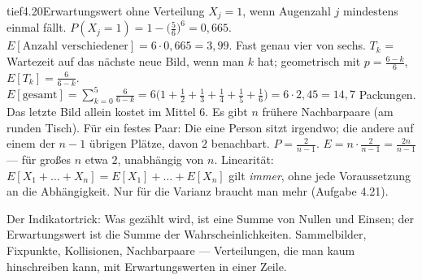 \begin{loesungkarte}{tief}{4.20}{Erwartungswert ohne Verteilung}
$X_j = 1$, wenn Augenzahl $j$ mindestens einmal fällt. $P(X_j = 1) = 1 - \bigl(\frac56\bigr)^{6} = 0{,}665$. $E[\text{Anzahl verschiedener}] = 6\cdot0{,}665 = 3{,}99$. Fast genau vier von sechs.
$T_k$ = Wartezeit auf das nächste neue Bild, wenn man $k$ hat; geometrisch mit $p = \frac{6 - k}6$, $E[T_k] = \frac6{6 - k}$. $E[\text{gesamt}] = \sum_{k=0}^{5}\frac6{6 - k} = 6\bigl(1 + \frac12 + \frac13 + \frac14 + \frac15 + \frac16\bigr) = 6\cdot2{,}45 = 14{,}7$ Packungen. Das letzte Bild allein kostet im Mittel $6$.
Es gibt $n$ frühere Nachbarpaare (am runden Tisch). Für ein festes Paar: Die eine Person sitzt irgendwo; die andere auf einem der $n - 1$ übrigen Plätze, davon $2$ benachbart. $P = \frac2{n - 1}$. $E = n\cdot\frac2{n - 1} = \frac{2n}{n - 1}$ --- für großes $n$ etwa $2$, unabhängig von $n$.
Linearität: $E[X_1 + \dots + X_n] = E[X_1] + \dots + E[X_n]$ gilt \emph{immer}, ohne jede Voraussetzung an die Abhängigkeit. Nur für die Varianz braucht man mehr (Aufgabe 4.21).
\begin{mitnehmen}\kastentext
Der Indikatortrick: Was gezählt wird, ist eine Summe von Nullen und Einsen; der Erwartungswert ist die Summe der Wahrscheinlichkeiten. Sammelbilder, Fixpunkte, Kollisionen, Nachbarpaare --- Verteilungen, die man kaum hinschreiben kann, mit Erwartungswerten in einer Zeile.
\end{mitnehmen}
\end{loesungkarte}

